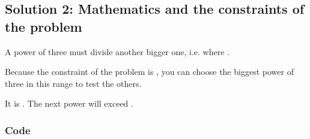 \documentclass[letterpaper,12pt,english]{book}
\begin{document}
\subsection{Solution 2: Mathematics and the constraints of the problem}
\label{\detokenize{Mathematics/09_MTH_326_Power_of_Three:solution-2-mathematics-and-the-constraints-of-the-problem}}
\sphinxAtStartPar
A power of three must divide another bigger one, i.e.  where .

\sphinxAtStartPar
Because the constraint of the problem is , you can choose the biggest power of three in this range to test the others.

\sphinxAtStartPar
It is . The next power will exceed .


\subsubsection{Code}
\label{\detokenize{Mathematics/09_MTH_326_Power_of_Three:id1}}
\begin{sphinxVerbatim}[commandchars=\\\{\}]
\end{sphinxVerbatim}
\end{document}
